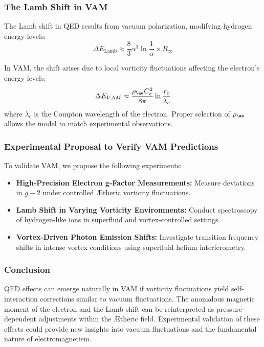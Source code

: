 \subsubsection*{The Lamb Shift in VAM}
The Lamb shift in QED results from vacuum polarization, modifying hydrogen energy levels:
\begin{equation}
    \Delta E_{\text{Lamb}} \approx \frac{8}{3} \alpha^3 \ln \frac{1}{\alpha} \times R_{\infty}
\end{equation}

In VAM, the shift arises due to local vorticity fluctuations affecting the electron's energy levels:
\begin{equation}
    \Delta E_{VAM} \approx \frac{\rho_{\ae} C_e^2}{8\pi} \ln \frac{r_c}{\lambda_c}
\end{equation}
where $\lambda_c$ is the Compton wavelength of the electron. Proper selection of $\rho_{\ae}$ allows the model to match experimental observations.

\subsubsection*{Experimental Proposal to Verify VAM Predictions}
To validate VAM, we propose the following experiments:
\begin{itemize}
    \item \textbf{High-Precision Electron g-Factor Measurements:} Measure deviations in $g-2$ under controlled \AE theric vorticity fluctuations.
    \item \textbf{Lamb Shift in Varying Vorticity Environments:} Conduct spectroscopy of hydrogen-like ions in superfluid and vortex-controlled settings.
    \item \textbf{Vortex-Driven Photon Emission Shifts:} Investigate transition frequency shifts in intense vortex conditions using superfluid helium interferometry.
\end{itemize}

\subsubsection*{Conclusion}
QED effects can emerge naturally in VAM if vorticity fluctuations yield self-interaction corrections similar to vacuum fluctuations. The anomalous magnetic moment of the electron and the Lamb shift can be reinterpreted as pressure-dependent adjustments within the \AE theric field. Experimental validation of these effects could provide new insights into vacuum fluctuations and the fundamental nature of electromagnetism.


